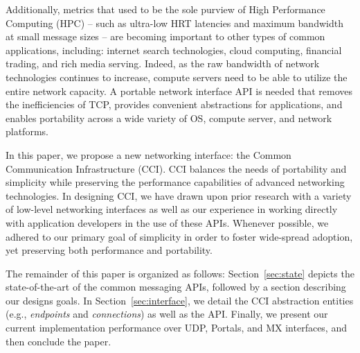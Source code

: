 Additionally, metrics that used to be the sole purview of High
Performance Computing (HPC) -- such as ultra-low HRT latencies and
maximum bandwidth at small message sizes -- are becoming important
to other types of common applications, including: internet search
technologies, cloud computing, financial trading, and rich media
serving.
%
Indeed, as the raw bandwidth of network technologies continues to
increase, compute servers need to be able to utilize the entire
network capacity.
%
A portable network interface API is needed that removes the
inefficiencies of TCP, provides convenient abstractions for
applications, and enables portability across a wide variety of OS,
compute server, and network platforms.

In this paper, we propose a new networking interface: the Common
Communication Infrastructure (CCI).  
%
CCI balances the needs of portability and simplicity while preserving
the performance capabilities of advanced networking technologies. 
%
In designing CCI, we have drawn upon prior research with a variety of
low-level networking interfaces as well as our experience in working
directly with application developers in the use of these APIs.
%
Whenever possible, we adhered to our primary goal of simplicity in
order to foster wide-spread adoption, yet preserving both performance
and portability.

The remainder of this paper is organized as follows:
%
Section~\ref{sec:state} depicts the state-of-the-art of the common
messaging APIs, followed by a section describing our designs goals.
%
In Section~\ref{sec:interface}, we detail the CCI abstraction entities
(e.g., {\em endpoints} and {\em connections}) as well as the API.
%
Finally, we present our current implementation performance over UDP, Portals, and MX interfaces, and then conclude the paper.



